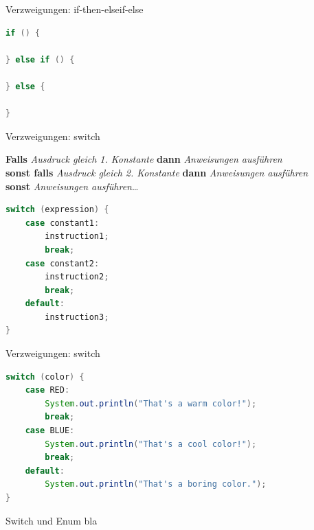 \documentclass[18pt]{beamer}
\begin{document}
\begin{frame}[fragile]{Verzweigungen: if-then-elseif-else}
    \begin{exampleblock}{}
        \begin{lstlisting}[language=Java]
if () {

} else if () {

} else {

}
        \end{lstlisting}
    \end{exampleblock}
\end{frame}

\begin{frame}[fragile]{Verzweigungen: switch}
    \begin{block}{}
        \textbf{Falls} \textit{Ausdruck gleich 1. Konstante} \textbf{dann} \textit{Anweisungen ausführen}\\
        \textbf{sonst falls} \textit{Ausdruck gleich 2. Konstante} \textbf{dann} \textit{Anweisungen ausführen}\\
        \textbf{sonst} \textit{Anweisungen ausführen}\dots
    \end{block}
    \pause

    \begin{block}{}
        \begin{lstlisting}[language=Java]
switch (expression) {
    case constant1:
        instruction1;
        break;
    case constant2:
        instruction2;
        break;
    default:
        instruction3;
}
        \end{lstlisting}
    \end{block}
\end{frame}

\begin{frame}[fragile]{Verzweigungen: switch}
    \begin{exampleblock}{}
        \begin{lstlisting}[language=Java]
switch (color) {
    case RED:
        System.out.println("That's a warm color!");
        break;
    case BLUE:
        System.out.println("That's a cool color!");
        break;
    default:
        System.out.println("That's a boring color.");
}
        \end{lstlisting}
    \end{exampleblock}
\end{frame}

\begin{frame}[fragile]{Switch und Enum}
    bla
\end{frame}
\end{document}

